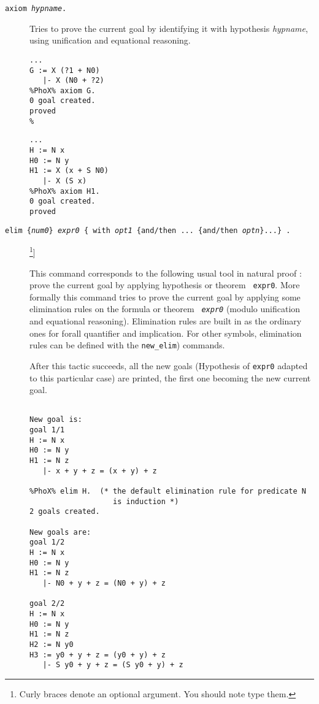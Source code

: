 \begin{description}

\item[{\tt axiom {\em hypname}.}]
 Tries to prove the current
  goal by identifying it with hypothesis {\em hypname}, using
  unification and equational reasoning.

\begin{verbatim}
...
G := X (?1 + N0)
   |- X (N0 + ?2)
%PhoX% axiom G.
0 goal created.
proved
%
\end{verbatim}

\begin{verbatim}
...
H := N x
H0 := N y
H1 := X (x + S N0)
   |- X (S x)
%PhoX% axiom H1.
0 goal created.
proved
\end{verbatim}

\item[{\tt elim \{{\em num0}\} {\em expr0} 
\{ with {\em opt1} \{and/then  ... \{and/then {\em optn}\}...\} 
.}]\footnote{Curly braces denote an optional
  argument. You should note type them.}]

  
  This command corresponds to the following usual tool in natural proof
  : prove the current goal by applying hypothesis or theorem {\tt
    expr0}.  More formally this command tries to prove the current goal
  by applying some elimination rules on the formula or theorem {\tt\em
    expr0} (modulo unification and equational reasoning).  Elimination
  rules are built in as the ordinary ones for forall quantifier and
  implication. For other symbols,  elimination
  rules can be defined with the {\tt new\_elim}) commands.

 After this tactic succeeds, all
the new goals (Hypothesis of {\tt expr0} adapted to this particular
case) are printed, the first one becoming the new current goal.


\begin{verbatim}

New goal is:
goal 1/1
H := N x
H0 := N y
H1 := N z
   |- x + y + z = (x + y) + z

%PhoX% elim H.  (* the default elimination rule for predicate N 
                   is induction *)
2 goals created.

New goals are:
goal 1/2
H := N x
H0 := N y
H1 := N z
   |- N0 + y + z = (N0 + y) + z

goal 2/2
H := N x
H0 := N y
H1 := N z
H2 := N y0
H3 := y0 + y + z = (y0 + y) + z
   |- S y0 + y + z = (S y0 + y) + z
\end{verbatim}


\end{description}
